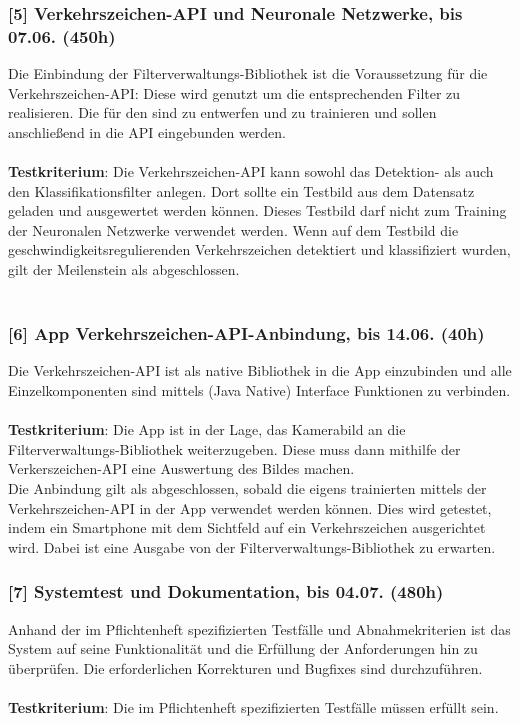 \subsubsection{[5] Verkehrszeichen-API und Neuronale Netzwerke, bis 07.06. (450h)}
Die Einbindung der  \gls{Filterverwaltungs-Bibliothek}  ist die Voraussetzung für die \gls{Verkehrszeichen-API}: Diese wird genutzt um die entsprechenden \gls{Filter} zu realisieren. Die  für den  sind zu entwerfen und zu trainieren und sollen anschließend in die \gls{API} eingebunden werden.\\
\\
\textbf{Testkriterium}: Die \gls{Verkehrszeichen-API} kann sowohl das Detektion- als auch den Klassifikationsfilter anlegen. Dort sollte ein Testbild aus dem Datensatz geladen und ausgewertet werden können. Dieses Testbild darf nicht zum Training der Neuronalen Netzwerke verwendet werden. Wenn auf dem Testbild die geschwindigkeitsregulierenden Verkehrszeichen detektiert und klassifiziert wurden, gilt der Meilenstein als abgeschlossen.\\
\\
\subsubsection{[6] \gls{App} Verkehrszeichen-API-Anbindung, bis 14.06. (40h)}
Die \gls{Verkehrszeichen-API} ist als native Bibliothek in die \gls{App} einzubinden und alle Einzelkomponenten sind mittels (Java Native) Interface Funktionen zu verbinden.\\
\\
\textbf{Testkriterium}: Die \gls{App} ist in der Lage, das Kamerabild an die Filterverwaltungs-Bibliothek weiterzugeben.
Diese muss dann mithilfe der Verkerszeichen-API eine Auswertung des Bildes machen.\\
Die Anbindung gilt als abgeschlossen, sobald die eigens trainierten  mittels der Verkehrszeichen-API in der \gls{App} verwendet werden können.
Dies wird getestet, indem ein \gls{Smartphone} mit dem Sichtfeld auf ein Verkehrszeichen ausgerichtet wird. Dabei ist eine Ausgabe von der \gls{Filterverwaltungs-Bibliothek} zu erwarten.\\

\subsubsection{[7] Systemtest und Dokumentation, bis 04.07. (480h)}
Anhand der im Pflichtenheft spezifizierten Testfälle und Abnahmekriterien ist das \gls{System} auf seine Funktionalität und die Erfüllung der Anforderungen hin zu überprüfen. Die erforderlichen Korrekturen und Bugfixes sind durchzuführen.\\
\\
\textbf{Testkriterium}: Die im Pflichtenheft spezifizierten Testfälle müssen erfüllt sein.\\

